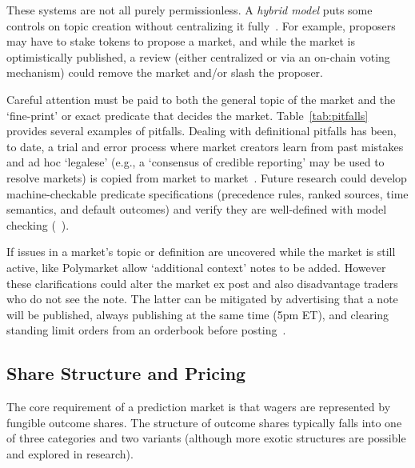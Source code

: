 
These systems are not all purely permissionless. A \textit{hybrid model} puts some controls on topic creation without centralizing it fully~\cite{AKPWZ19}. For example, proposers may have to stake tokens to propose a market, and while the market is optimistically published, a review (either centralized or via an on-chain voting mechanism) could remove the market and/or slash the proposer.  

Careful attention must be paid to both the general topic of the market and the `fine-print' or exact predicate that decides the market. Table~\ref{tab:pitfalls} provides several examples of pitfalls. Dealing with definitional pitfalls has been, to date, a trial and error process where market creators learn from past mistakes and ad hoc `legalese' (e.g., a `consensus of credible reporting' may be used to resolve markets) is copied from market to market~\cite{Ad24}. Future research could develop machine-checkable predicate specifications (precedence rules, ranked sources, time semantics, and default outcomes) and verify they are well-defined with model checking (\cf~\cite{Cla21}). 

If issues in a market's topic or definition are uncovered while the market is still active, \depms like Polymarket allow `additional context' notes to be added. However these clarifications could alter the market ex post and also disadvantage traders who do not see the note. The latter can be mitigated by advertising that a note will be published, always publishing at the same time (\eg 5pm ET), and clearing standing limit orders from an orderbook before posting~\cite{poly}.


\subsection{Share Structure and Pricing}\label{wf:mech}\label{wf:price}

The core requirement of a prediction market is that wagers are represented by fungible outcome shares. The structure of outcome shares typically falls into one of three categories and two variants (although more exotic structures are possible and explored in research). 

